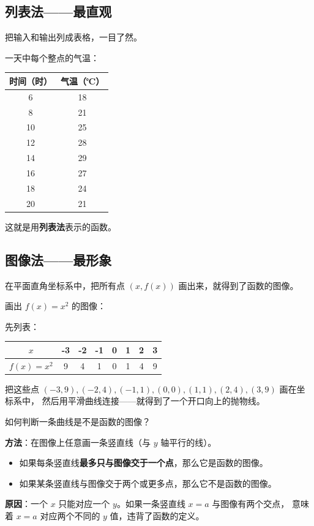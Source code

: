 \subsection{列表法——最直观}

把输入和输出列成表格，一目了然。

\begin{examplebox}[6]
一天中每个整点的气温：

\begin{center}
\begin{tabular}{c|c}
\textbf{时间（时）} & \textbf{气温（℃）} \\
\hline
6 & 18 \\
8 & 21 \\
10 & 25 \\
12 & 28 \\
14 & 29 \\
16 & 27 \\
18 & 24 \\
20 & 21 \\
\end{tabular}
\end{center}

这就是用\textbf{列表法}表示的函数。
\end{examplebox}

\subsection{图像法——最形象}

在平面直角坐标系中，把所有点 \((x, f(x))\) 画出来，就得到了函数的图像。

\begin{examplebox}[7]
画出 \(f(x) = x^2\) 的图像：

先列表：
\begin{center}
\begin{tabular}{c|c|c|c|c|c|c|c}
\(x\) & -3 & -2 & -1 & 0 & 1 & 2 & 3 \\
\hline
\(f(x) = x^2\) & 9 & 4 & 1 & 0 & 1 & 4 & 9 \\
\end{tabular}
\end{center}

把这些点 \((-3,9), (-2,4), (-1,1), (0,0), (1,1), (2,4), (3,9)\) 画在坐标系中，
然后用平滑曲线连接——就得到了一个开口向上的抛物线。
\end{examplebox}

\begin{theorembox}[垂线检验法]
如何判断一条曲线是不是函数的图像？

\textbf{方法}：在图像上任意画一条竖直线（与 \(y\) 轴平行的线）。
\begin{itemize}
  \item 如果每条竖直线\textbf{最多只与图像交于一个点}，那么它是函数的图像。
  \item 如果某条竖直线与图像交于两个或更多点，那么它不是函数的图像。
\end{itemize}

\textbf{原因}：一个 \(x\) 只能对应一个 \(y\)。如果一条竖直线 \(x = a\) 与图像有两个交点，
意味着 \(x = a\) 对应两个不同的 \(y\) 值，违背了函数的定义。
\end{theorembox}



